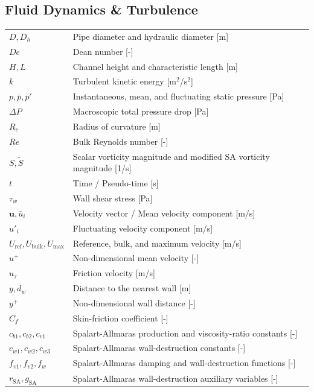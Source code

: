 \documentclass[master=ewtk,masteroption=,openany]{kulemt}
\begin{document}
\subsection*{Fluid Dynamics \& Turbulence}
\begin{flushleft}
	\renewcommand{\arraystretch}{1.1}
	\begin{tabularx}{\textwidth}{@{}p{35mm}X@{}}
		$D, D_h$ & Pipe diameter and hydraulic diameter [m] \\
		$De$ & Dean number [-] \\
		$H, L$ & Channel height and characteristic length [m] \\
		$k$ & Turbulent kinetic energy [m$^2$/s$^2$] \\
		$p, \bar{p}, p'$ & Instantaneous, mean, and fluctuating static pressure [Pa] \\
		$\Delta P$ & Macroscopic total pressure drop [Pa] \\
		$R_c$ & Radius of curvature [m] \\
		$Re$ & Bulk Reynolds number [-] \\
			$S, \tilde{S}$ & Scalar vorticity magnitude and modified SA vorticity magnitude [1/s] \\
			$t$ & Time / Pseudo-time [s] \\
			$\tau_w$ & Wall shear stress [Pa] \\
		$\mathbf{u}, \bar{u}_i$ & Velocity vector / Mean velocity component [m/s] \\
		$u'_i$ & Fluctuating velocity component [m/s] \\
		$U_{\mathrm{ref}}, U_{\mathrm{bulk}}, U_{\max}$ & Reference, bulk, and maximum velocity [m/s] \\
		$u^+$ & Non-dimensional mean velocity [-] \\
		$u_\tau$ & Friction velocity [m/s] \\
		$y, d_w$ & Distance to the nearest wall [m] \\
		$y^+$ & Non-dimensional wall distance [-] \\
		$C_f$ & Skin-friction coefficient [-] \\
		$c_{b1}, c_{b2}, c_{v1}$ & Spalart-Allmaras production and viscosity-ratio constants [-] \\
		$c_{w1}, c_{w2}, c_{w3}$ & Spalart-Allmaras wall-destruction constants [-] \\
		$f_{v1}, f_{v2}, f_w$ & Spalart-Allmaras damping and wall-destruction functions [-] \\
		$r_{\mathrm{SA}}, g_{\mathrm{SA}}$ & Spalart-Allmaras wall-destruction auxiliary variables [-] \\

\end{tabularx}
\end{flushleft}
\end{document}
